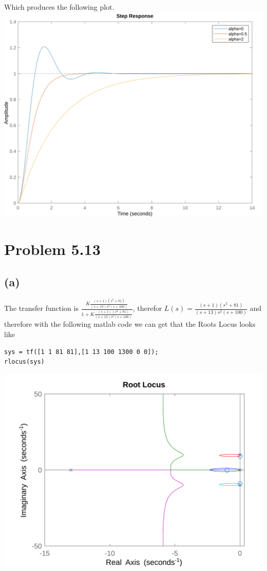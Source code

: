 \documentclass[12pt]{article}
\begin{document}
Which produces the following plot.\\
\includegraphics[scale=0.25]{Problem1fig4.png}\\
\section*{Problem 5.13}
\subsection*{(a)}
The transfer function is $\frac{K\frac{(s+1)(s^2+81)}{(s+13)s^2(s+100)}}{1+K\frac{(s+1)(s^2+81)}{(s+13)s^2(s+100)}}$, therefor $L(s)=\frac{(s+1)(s^2+81)}{(s+13)s^2(s+100)}$
and therefore with the following matlab code we can get that the Roots Locus looks like 
\begin{verbatim}
sys = tf([1 1 81 81],[1 13 100 1300 0 0]);
rlocus(sys)
\end{verbatim}
\includegraphics[scale=0.25]{Problem2Fig1.png}\\
\end{document}
